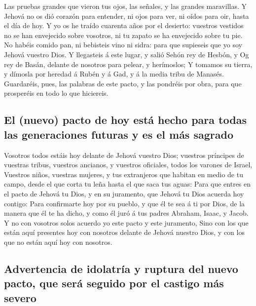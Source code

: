  Las pruebas grandes que vieron tus ojos, las señales, y
las grandes maravillas.  Y Jehová no os dió corazón para
entender, ni ojos para ver, ni oídos para oir, hasta el día de hoy.
 Y yo os he traído cuarenta años por el desierto: vuestros
vestidos no se han envejecido sobre vosotros, ni tu zapato se ha
envejecido sobre tu pie.  No habéis comido pan, ni
bebisteis vino ni sidra: para que supieseis que yo soy Jehová vuestro
Dios.  Y llegasteis á este lugar, y salió Sehón rey de
Hesbón, y Og rey de Basán, delante de nosotros para pelear, y
herímoslos;  Y tomamos su tierra, y dímosla por heredad á
Rubén y á Gad, y á la media tribu de Manasés.  Guardaréis,
pues, las palabras de este pacto, y las pondréis por obra, para que
prosperéis en todo lo que hiciereis.

\hypertarget{el-nuevo-pacto-de-hoy-estuxe1-hecho-para-todas-las-generaciones-futuras-y-es-el-muxe1s-sagrado}{%
\subsection{El (nuevo) pacto de hoy está hecho para todas las
generaciones futuras y es el más
sagrado}\label{el-nuevo-pacto-de-hoy-estuxe1-hecho-para-todas-las-generaciones-futuras-y-es-el-muxe1s-sagrado}}

 Vosotros todos estáis hoy delante de Jehová vuestro
Dios; vuestros príncipes de vuestras tribus, vuestros ancianos, y
vuestros oficiales, todos los varones de Israel, 
Vuestros niños, vuestras mujeres, y tus extranjeros que habitan en medio
de tu campo, desde el que corta tu leña hasta el que saca tus aguas:
 Para que entres en el pacto de Jehová tu Dios, y en su
juramento, que Jehová tu Dios acuerda hoy contigo:  Para
confirmarte hoy por su pueblo, y que él te sea á ti por Dios, de la
manera que él te ha dicho, y como él juró á tus padres Abraham, Isaac, y
Jacob.  Y no con vosotros solos acuerdo yo este pacto y
este juramento,  Sino con los que están aquí presentes
hoy con nosotros delante de Jehová nuestro Dios, y con los que no están
aquí hoy con nosotros.

\hypertarget{advertencia-de-idolatruxeda-y-ruptura-del-nuevo-pacto-que-seruxe1-seguido-por-el-castigo-muxe1s-severo}{%
\subsection{Advertencia de idolatría y ruptura del nuevo pacto, que será
seguido por el castigo más
severo}\label{advertencia-de-idolatruxeda-y-ruptura-del-nuevo-pacto-que-seruxe1-seguido-por-el-castigo-muxe1s-severo}}

